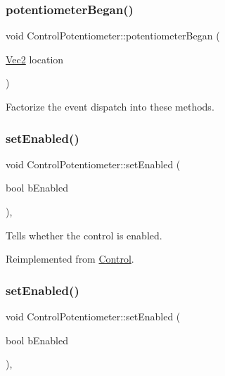 \subsubsection{\texorpdfstring{potentiometer\+Began()}{potentiometerBegan()}\hspace{0.1cm}{\footnotesize\ttfamily [2/2]}}
{\footnotesize\ttfamily void Control\+Potentiometer\+::potentiometer\+Began (\begin{DoxyParamCaption}\item[{\hyperlink{classVec2}{Vec2}}]{location }\end{DoxyParamCaption})}

Factorize the event dispatch into these methods. \mbox{\label{classControlPotentiometer_ac67b583a3a21f6c44ffcf57b41c33278}} 
\subsubsection{\texorpdfstring{set\+Enabled()}{setEnabled()}\hspace{0.1cm}{\footnotesize\ttfamily [1/2]}}
{\footnotesize\ttfamily void Control\+Potentiometer\+::set\+Enabled (\begin{DoxyParamCaption}\item[{bool}]{b\+Enabled }\end{DoxyParamCaption})\hspace{0.3cm}{\ttfamily [override]}, {\ttfamily [virtual]}}

Tells whether the control is enabled. 

Reimplemented from \hyperlink{classControl_a55339ae920182245d5ec114c33f4b1fd}{Control}.

\mbox{\label{classControlPotentiometer_ac67b583a3a21f6c44ffcf57b41c33278}} 
\subsubsection{\texorpdfstring{set\+Enabled()}{setEnabled()}\hspace{0.1cm}{\footnotesize\ttfamily [2/2]}}
{\footnotesize\ttfamily void Control\+Potentiometer\+::set\+Enabled (\begin{DoxyParamCaption}\item[{bool}]{b\+Enabled }\end{DoxyParamCaption})\hspace{0.3cm}{\ttfamily [override]}, {\ttfamily [virtual]}}

